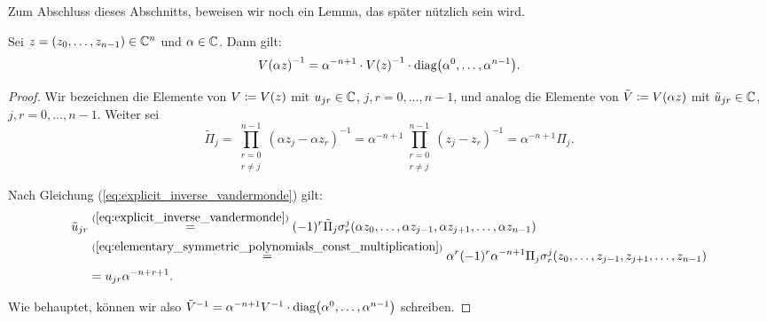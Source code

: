 \noindent Zum Abschluss dieses Abschnitts, beweisen wir noch ein Lemma, das später
nützlich sein wird.

\begin{lemma}
    \label{lemma:inverse_vandermonde_const_multiplication}
    Sei $z = (z_0, \dots, z_{n-1}) \in \mathbb{C}^n$ und $\alpha \in \mathbb{C}$.
    Dann gilt:
    \begin{equation}
        \label{eq:inverse_vandermonde_const_multiplication}
        V \! \left( \alpha z \right)^{-1}
        = \alpha^{-n+1} \cdot V \! \left( z \right)^{-1} \cdot \text{diag$ \left( \alpha^0, \dots, \alpha^{n-1} \right)$}.
    \end{equation}
\end{lemma}

\begin{proof}
    Wir bezeichnen die Elemente von
    $V \coloneqq V \! \left( z \right)$ mit $u_{jr} \in \mathbb{C}$, $j,r = 0, \dots, n-1$,
    und analog die Elemente von
    $\tilde{V} \coloneqq V \! \left( \alpha z \right)$ mit
    $\tilde{u}_{jr} \in \mathbb{C}$, $j,r = 0, \dots, n-1$.
    Weiter sei
    \[
        \tilde{\Pi}_j
        = \prod_{\substack{r=0\\ r \neq j}}^{n-1} \left( \alpha z_j - \alpha z_r \right)^{-1}
        = \alpha^{-n+1} \prod_{\substack{r=0\\ r \neq j}}^{n-1} \left( z_j - z_r \right)^{-1}
        = \alpha^{-n+1} \Pi_j.
    \]

    \noindent Nach Gleichung (\ref{eq:explicit_inverse_vandermonde}) gilt:
    \begin{equation}
        \label{eq:inverse_vandermonde_const_multiplication}
        \begin{split}
            \tilde{u}_{jr}
            &\overset{(\ref{eq:explicit_inverse_vandermonde})}{=}
                (-1)^{r} \tilde{\Pi}_j \sigma_{r}^{j}(\alpha z_0, \dots, \alpha z_{j-1}, \alpha z_{j+1}, \dots, \alpha z_{n-1})\\
            &\overset{(\ref{eq:elementary_symmetric_polynomials_const_multiplication})}{=}
                \alpha^{r} (-1)^{r} \alpha^{-n+1} \Pi_j \sigma_{r}^{j}(z_0, \dots, z_{j-1}, z_{j+1}, \dots, z_{n-1})\\
            &= u_{jr} \alpha^{-n+r+1}.
        \end{split}
    \end{equation}

    \noindent Wie behauptet, können wir also
    $\tilde{V}^{-1} = \alpha^{-n+1} V^{-1} \cdot \text{diag$ \left( \alpha^{0}, \dots, \alpha^{n-1} \right)$}$ schreiben.

\end{proof}

